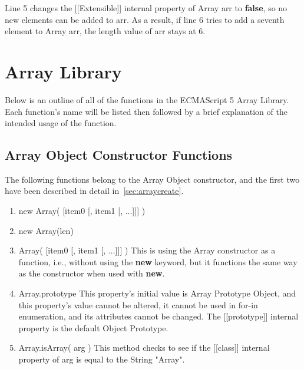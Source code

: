 \documentclass[a4paper,11pt,twoside]{report}
\begin{document}
Line 5 changes the [[Extensible]] internal property of Array arr to \textbf{false}, so no new elements can be added to arr. As a result, if line 6 tries to add a seventh element to Array arr, the length value of arr stays at 6.


\chapter{Array Library}
Below is an outline of all of the functions in the ECMAScript 5 Array Library. Each function's name will be listed then followed by a brief explanation of the intended usage of the function.

\section{Array Object Constructor Functions}
The following functions belong to the Array Object constructor, and the first two have been described in detail in~\ref{sec:arraycreate}.
\begin{enumerate}
\item new Array( [item0 [, item1 [, ...]]] )
\item new Array(len)
\item Array( [item0 [, item1 [, ...]]] ) \newline
This is using the Array constructor as a function, i.e., without using the \textbf{new} keyword, but it functions the same way as the constructor when used with \textbf{new}.
\item Array.prototype \newline
This property's initial value is Array Prototype Object, and this property's value cannot be altered, it cannot be used in for-in enumeration, and its attributes cannot be changed. The [[prototype]] internal property is the default Object Prototype.
\item Array.isArray( arg ) \newline
This method checks to see if the [[class]] internal property of arg is equal to the String "Array".
\end{enumerate}
\end{document}
